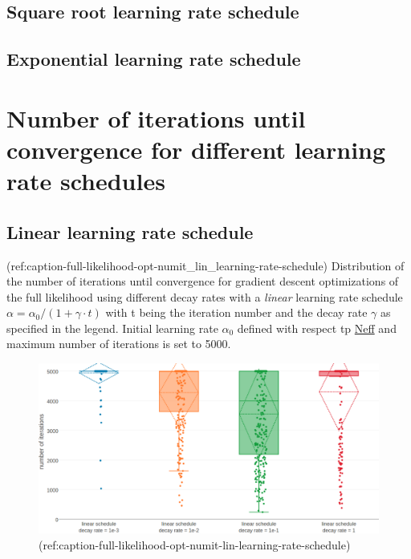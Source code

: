 \documentclass[12pt,a4paper,twoside]{book}
\theoremstyle{definition}
\theoremstyle{definition}
\theoremstyle{remark}
\begin{document}
\subsection{Square root learning rate
schedule}\label{square-root-learning-rate-schedule}

\subsection{Exponential learning rate
schedule}\label{exponential-learning-rate-schedule}

\section{Number of iterations until convergence for different learning
rate schedules}\label{learning-rate-schedules-distribution-iterations}

\subsection{Linear learning rate
schedule}\label{linear-learning-rate-schedule-1}

(ref:caption-full-likelihood-opt-numit\_lin\_learning-rate-schedule)
Distribution of the number of iterations until convergence for gradient
descent optimizations of the full likelihood using different decay rates
with a \emph{linear} learning rate schedule
\(\alpha = \alpha_0 / (1 + \gamma \cdot t)\) with t being the iteration
number and the decay rate \(\gamma\) as specified in the legend. Initial
learning rate \(\alpha_0\) defined with respect tp
\protect\hyperlink{abbrev}{Neff} and maximum number of iterations is set
to 5000.

\begin{figure}

{\centering \includegraphics[width=0.9\linewidth]{img/full_likelihood/appendix/distribution_numiterations_against_linear_learningrate_schedule} 

}

\caption{(ref:caption-full-likelihood-opt-numit-lin-learning-rate-schedule)}\label{fig:full-likelihood-opt-numit-lin-learning-rate-schedule}
\end{figure}
\end{document}
